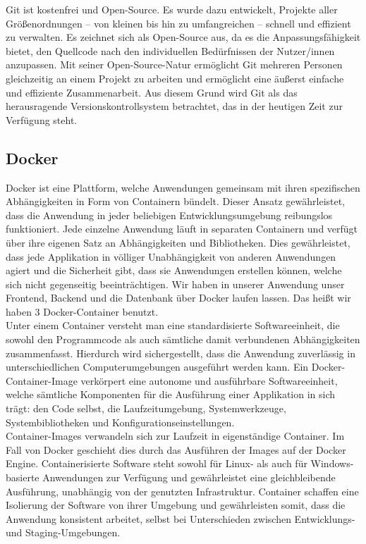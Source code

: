 Git ist kostenfrei und Open-Source. Es wurde dazu entwickelt, Projekte aller 
Größenordnungen – von kleinen bis hin zu umfangreichen – schnell und effizient zu verwalten. 
Es zeichnet sich als Open-Source aus, da es die Anpassungsfähigkeit bietet, den Quellcode 
nach den individuellen Bedürfnissen der Nutzer/innen anzupassen. 
Mit seiner Open-Source-Natur ermöglicht Git mehreren Personen gleichzeitig an einem 
Projekt zu arbeiten und ermöglicht eine äußerst einfache und effiziente Zusammenarbeit. 
Aus diesem Grund wird Git als das herausragende Versionskontrollsystem betrachtet, 
das in der heutigen Zeit zur Verfügung steht.
\newpage

\subsection*{Docker}

Docker ist eine Plattform, welche Anwendungen gemeinsam mit ihren spezifischen Abhängigkeiten 
in Form von Containern bündelt. Dieser Ansatz gewährleistet, dass die Anwendung in 
jeder beliebigen Entwicklungsumgebung reibungslos funktioniert.
Jede einzelne Anwendung läuft in separaten Containern und verfügt über 
ihre eigenen Satz an Abhängigkeiten und Bibliotheken. Dies gewährleistet, dass jede 
Applikation in völliger Unabhängigkeit von anderen Anwendungen agiert und die Sicherheit gibt, 
dass sie Anwendungen erstellen können, welche sich nicht gegenseitig beeinträchtigen.
Wir haben in unserer Anwendung unser Frontend, Backend und die Datenbank über Docker laufen lassen.
Das heißt wir haben 3 Docker-Container benutzt. \\
 
Unter einem Container versteht man eine standardisierte Softwareeinheit, die sowohl den 
Programmcode als auch sämtliche damit verbundenen Abhängigkeiten zusammenfasst. 
Hierdurch wird sichergestellt, dass die Anwendung zuverlässig in unterschiedlichen 
Computerumgebungen ausgeführt werden kann. Ein Docker-Container-Image verkörpert eine 
autonome und ausführbare Softwareeinheit, welche sämtliche Komponenten für die Ausführung 
einer Applikation in sich trägt: den Code selbst, die Laufzeitumgebung, Systemwerkzeuge, 
Systembibliotheken und Konfigurationseinstellungen. \\

Container-Images verwandeln sich zur Laufzeit in eigenständige Container. 
Im Fall von Docker geschieht dies durch das Ausführen der Images auf der Docker Engine. 
Containerisierte Software steht sowohl für Linux- als auch für Windows-basierte Anwendungen 
zur Verfügung und gewährleistet eine gleichbleibende Ausführung, unabhängig von der genutzten 
Infrastruktur. Container schaffen eine Isolierung der Software von ihrer Umgebung und 
gewährleisten somit, dass die Anwendung konsistent arbeitet, selbst bei Unterschieden 
zwischen Entwicklungs- und Staging-Umgebungen.
\newpage
